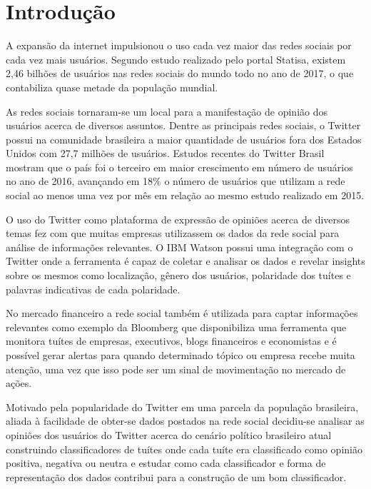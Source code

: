 \chapter{Introdução}

A expansão da internet impulsionou o uso cada vez maior das redes sociais por cada vez mais
usuários. Segundo estudo realizado pelo portal Statisa\cite{statisa}, existem
2,46 bilhões de usuários nas redes sociais do mundo todo no ano de 2017, o que contabiliza
quase metade da população mundial.

As redes sociais tornaram-se um local para a manifestação de opinião dos usuários acerca de
diversos assuntos. Dentre as principais redes sociais, o Twitter possui na comunidade brasileira
a maior quantidade de usuários fora dos Estados Unidos com 27,7 milhões de usuários.
Estudos recentes do Twitter Brasil mostram que o país foi o terceiro em maior crescimento em número
de usuários no ano de 2016, avançando em 18\% o número de usuários que utilizam a rede social ao
menos uma vez por mês em relação ao mesmo estudo realizado em 2015.\cite{twitterFolha}

O uso do Twitter como plataforma de expressão de opiniões acerca de diversos temas fez com que
muitas empresas utilizassem os dados da rede social para análise de informações relevantes. O IBM
Watson possui uma integração com o Twitter onde a ferramenta é capaz de coletar e analisar os dados
e revelar insights sobre os mesmos como localização, gênero dos usuários, polaridade dos tuítes
e palavras indicativas de cada polaridade. \cite{twitterWatson}

No mercado financeiro a rede social também é utilizada para captar informações relevantes como exemplo
da Bloomberg que disponibiliza uma ferramenta que monitora tuítes de empresas, executivos, blogs
financeiros e economistas e é possível gerar alertas para quando determinado tópico ou empresa recebe
muita atenção, uma vez que isso pode ser um sinal de movimentação no mercado de ações.	\cite{twitterBloomberg}

Motivado pela popularidade do Twitter em uma parcela da população brasileira, aliada à facilidade
de obter-se dados postados na rede social decidiu-se analisar as opiniões dos usuários do Twitter
acerca do cenário político brasileiro atual construindo classificadores de tuítes onde cada
tuíte era classificado como opinião positiva, negativa ou neutra e estudar como
cada classificador e forma de representação dos dados contribui para a construção de um bom
classificador.

